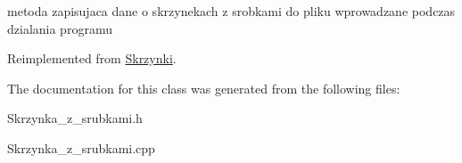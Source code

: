 metoda zapisujaca dane o skrzynekach z srobkami do pliku wprowadzane podczas dzialania programu 

Reimplemented from \mbox{\hyperlink{class_skrzynki_a2980647e51a17161872064efc5f1b185}{Skrzynki}}.



The documentation for this class was generated from the following files\+:\begin{DoxyCompactItemize}
\item 
Skrzynka\+\_\+z\+\_\+srubkami.\+h\item 
Skrzynka\+\_\+z\+\_\+srubkami.\+cpp\end{DoxyCompactItemize}
